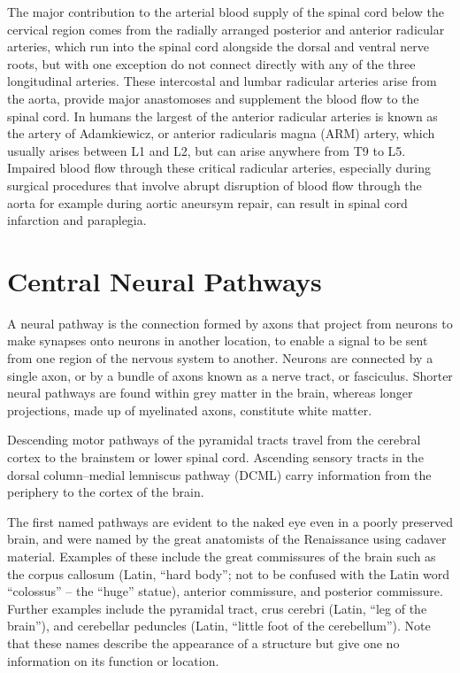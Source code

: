 \documentclass[]{book}
\begin{document}
The major contribution to the arterial blood supply of the spinal cord below the cervical region comes from the radially arranged posterior and anterior radicular arteries, which run into the spinal cord alongside the dorsal and ventral nerve roots, but with one exception do not connect directly with any of the three longitudinal arteries. These intercostal and lumbar radicular arteries arise from the aorta, provide major anastomoses and supplement the blood flow to the spinal cord. In humans the largest of the anterior radicular arteries is known as the artery of Adamkiewicz, or anterior radicularis magna (ARM) artery, which usually arises between L1 and L2, but can arise anywhere from T9 to L5. Impaired blood flow through these critical radicular arteries, especially during surgical procedures that involve abrupt disruption of blood flow through the aorta for example during aortic aneursym repair, can result in spinal cord infarction and paraplegia.

\hypertarget{central-neural-pathways}{%
\section{Central Neural Pathways}\label{central-neural-pathways}}

A neural pathway is the connection formed by axons that project from neurons to make synapses onto neurons in another location, to enable a signal to be sent from one region of the nervous system to another. Neurons are connected by a single axon, or by a bundle of axons known as a nerve tract, or fasciculus. Shorter neural pathways are found within grey matter in the brain, whereas longer projections, made up of myelinated axons, constitute white matter.

Descending motor pathways of the pyramidal tracts travel from the cerebral cortex to the brainstem or lower spinal cord. Ascending sensory tracts in the dorsal column--medial lemniscus pathway (DCML) carry information from the periphery to the cortex of the brain.

The first named pathways are evident to the naked eye even in a poorly preserved brain, and were named by the great anatomists of the Renaissance using cadaver material. Examples of these include the great commissures of the brain such as the corpus callosum (Latin, ``hard body''; not to be confused with the Latin word ``colossus'' -- the ``huge'' statue), anterior commissure, and posterior commissure. Further examples include the pyramidal tract, crus cerebri (Latin, ``leg of the brain''), and cerebellar peduncles (Latin, ``little foot of the cerebellum''). Note that these names describe the appearance of a structure but give one no information on its function or location.
\end{document}
